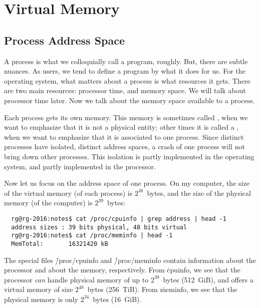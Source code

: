 \chapter{Virtual Memory}\label{ch:02-virtual-memory}


\section{Process Address Space}


A process is what we colloquially call a program, roughly.
But, there are subtle nuances.
As users, we tend to define a program by what it does for us.
For the operating system,
  what matters about a process is what resources it gets.
There are two main resources: processor time, and memory space.
We will talk about processor time later.
Now we talk about the memory space available to a process.

Each process gets its own memory.
This memory is sometimes called ,
  when we want to emphasize that it is not a physical entity;
other times it is called a ,
  when we want to emphasize that it is associated to one process.
Since distinct processes have isolated, distinct address spaces,
  a crash of one process will not bring down other processes.
This isolation is partly implemented in the operating system,
  and partly implemented in the processor.

Now let us focus on the address space of one process.
On my computer,
  the size of the virtual memory (of each process) is $2^{48}$~bytes,
  and the size of the physical memory (of the computer) is $2^{39}$~bytes:
\begin{verbatim}
  rg@rg-2016:notes$ cat /proc/cpuinfo | grep address | head -1
  address sizes	: 39 bits physical, 48 bits virtual
  rg@rg-2016:notes$ cat /proc/meminfo | head -1
  MemTotal:       16321420 kB
\end{verbatim}
The special files \.{/proc/cpuinfo} and \.{/proc/meminfo}
  contain information about the processor and about the memory, respectively.
From \.{cpuinfo},
  we see that the processor \emph{can} handle physical memory
    of up to $2^{39}$~bytes (512~GiB),
  and offers a virtual memory of size $2^{48}$~bytes (256~TiB).
From \.{meminfo},
  we see that the physical memory is only $2^{34}$~bytes (16~GiB).

